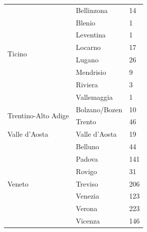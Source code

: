 \documentclass[a4paper,11pt]{article}
\begin{document}
\begin{longtable}{@{}lll@{}}
\multirow{8}{*}{Ticino} & Bellinzona & 14 \\
 & Blenio & 1 \\
 & Leventina & 1 \\
 & Locarno & 17 \\
 & Lugano & 26 \\
 & Mendrisio & 9 \\
 & Riviera & 3 \\
 & Vallemaggia & 1 \\\midrule
\multirow{2}{*}{Trentino-Alto Adige} & Bolzano/Bozen & 10 \\
 & Trento & 46 \\\midrule
Valle d'Aosta & Valle d'Aosta & 19 \\\midrule
\multirow{7}{*}{Veneto} & Belluno & 44 \\
 & Padova & 141 \\
 & Rovigo & 31 \\
 & Treviso & 206 \\
 & Venezia & 123 \\
 & Verona & 223 \\
 & Vicenza & 146 \\
\end{longtable}





\end{document}
